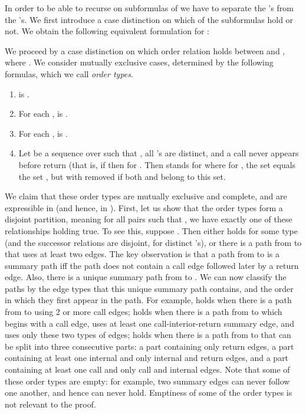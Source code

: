 \documentclass{LMCS}
\theoremstyle{plain}
\theoremstyle{definition}
\newcounter{example}
\begin{document}
In order to be able to recurse on subformulas of  we have to
separate the 's from the 's. We first introduce a case
distinction on which of the subformulas  hold or not. We obtain
the following equivalent formulation for :

We proceed by a case distinction on which order relation holds between
 and , where . 
We consider  mutually exclusive cases, determined by
the following formulas, which we call \emph{order types}.
 
\begin{enumerate}[]
\item  is .
\item For each ,   is  .
\item For each ,   is
.
\item Let   be a sequence over  such that
, all 's are distinct, and a call never appears before return
(that is, if  then  for .
Then  stands for
{\small
}\noindent
where for , the set  equals the set ,
but with  removed if both  and  belong to this set.
\end{enumerate}

\noindent We claim  that these order types are
mutually exclusive and complete, and are expressible in  (and hence, in 
). First, let us show that the order types form a disjoint partition, 
meaning for all pairs 
such that ,  we
have exactly one of these relationships holding true. 
To see this, suppose . Then either   holds for some type 
(and the successor relations  are disjoint, for distinct 's), 
or there is a path from  to 
that uses at least two edges. 
The key observation is that a path from  to  is a summary path iff
the path does not contain a call edge followed later by a return edge.
Also, there is a unique summary path from  to .
We can now classify the paths by the edge types that this unique summary
path contains, and the order in which they first appear in the path.
For example,  holds when there is a path from  to  using 2 or more
call edges;  holds when there is a path from  to 
which begins with a call edge, uses at least one call-interior-return summary edge, 
and uses only these two types of edges; 
 holds when there is a path from  to  that can be split into
three consecutive parts:
a part containing only return edges, a part containing at least one internal 
and only internal and return edges, 
and a part containing at least one call and only call and internal edges.
Note that some of these order types are empty: for example, two summary edges can never
follow one another, and hence  can never hold. 
Emptiness of some of the order types is not relevant to the proof.
\end{document}
